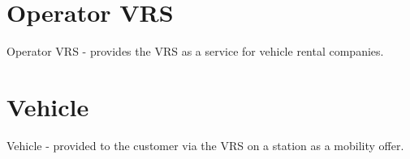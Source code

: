 \section*{Operator VRS}
Operator VRS - provides the VRS as a service for vehicle rental companies.

%
%
%
\section*{Vehicle}

Vehicle - provided to the customer via the VRS on a station as a mobility offer.

